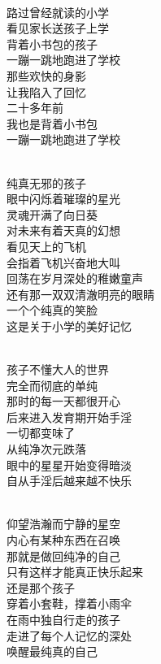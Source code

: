 \begin{poem}[唤醒最纯真的自己]
    \begin{multicols}{3}
        \begin{center}~\\
            路过曾经就读的小学 \\ 看见家长送孩子上学 \\ 背着小书包的孩子 \\ 一蹦一跳地跑进了学校 \\ 那些欢快的身影 \\ 让我陷入了回忆 \\ 二十多年前 \\ 我也是背着小书包 \\ 一蹦一跳地跑进了学校

            ~\\

            纯真无邪的孩子 \\ 眼中闪烁着璀璨的星光 \\ 灵魂开满了向日葵 \\ 对未来有着天真的幻想 \\ 看见天上的飞机 \\ 会指着飞机兴奋地大叫 \\ 回荡在岁月深处的稚嫩童声 \\ 还有那一双双清澈明亮的眼睛 \\ 一个个纯真的笑脸 \\ 这是关于小学的美好记忆

            ~\\

            孩子不懂大人的世界 \\ 完全而彻底的单纯 \\ 那时的每一天都很开心 \\ 后来进入发育期开始手淫 \\ 一切都变味了 \\ 从纯净次元跌落 \\ 眼中的星星开始变得暗淡 \\ 自从手淫后越来越不快乐

            ~\\

            仰望浩瀚而宁静的星空 \\ 内心有某种东西在召唤 \\ 那就是做回纯净的自己 \\ 只有这样才能真正快乐起来 \\ 还是那个孩子 \\ 穿着小套鞋，撑着小雨伞 \\ 在雨中独自行走的孩子 \\ 走进了每个人记忆的深处 \\ 唤醒最纯真的自己
        \end{center}
    \end{multicols}
\end{poem}

